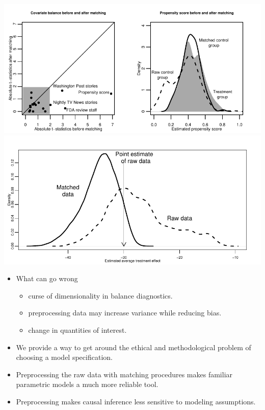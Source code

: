 \documentclass[20pt,landscape,pdftex]{foils}
\begin{document}
\hypersetup{pdfpagetransition=Replace}

\begin{center}
  \includegraphics[scale=1.2]{figs/fdabal}\pause \\
  \includegraphics[scale=1.2]{figs/fdadens}\pause
\end{center}



\hypersetup{pdfpagetransition=Replace}

\begin{itemize}
\item What can go wrong\pause
  \begin{itemize}
  \item curse of dimensionality in balance diagnostics.\pause
  \item preprocessing data may increase variance while reducing
    bias.\pause 
  \item change in quantities of interest.\pause
  \end{itemize}
\item We provide a way to get around the ethical and methodological
  problem of choosing a model specification.\pause
\item Preprocessing the raw data with matching procedures makes
  familiar parametric models a much more reliable tool.\pause

\item Preprocessing makes causal inference less sensitive to modeling
  assumptions.\pause 
\end{itemize}
\end{document}
